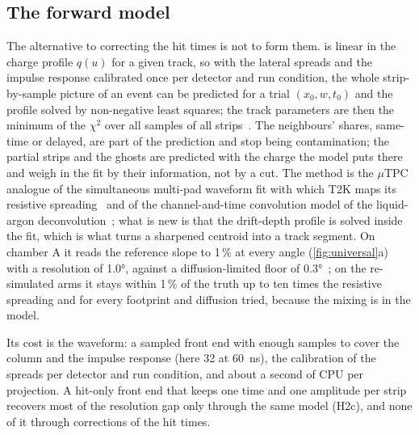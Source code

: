 \subsection{The forward model}\label{sec:forward}

The alternative to correcting the hit times is not to form them.  is linear in the charge profile $q(u)$ for
a given track, so with the lateral spreads and the impulse response calibrated once per detector and run condition, the whole
strip-by-sample picture of an event can be predicted for a trial $(x_0, w, t_0)$ and the profile solved by non-negative least
squares; the track parameters are then the minimum of the $\chi^2$ over all samples of all strips~\cite{paperII}. The neighbours'
shares, same-time or delayed, are part of the prediction and stop being contamination; the partial strips and the ghosts are
predicted with the charge the model puts there and weigh in the fit by their information, not by a cut. The method is the
$\mu$TPC analogue of the simultaneous multi-pad waveform fit with which T2K maps its resistive spreading~\cite{T2K2023} and of
the channel-and-time convolution model of the liquid-argon deconvolution~\cite{Adams2018a}; what is new is that the drift-depth
profile is solved inside the fit, which is what turns a sharpened centroid into a track segment. On chamber A it reads the
reference slope to 1\,\% at every angle (\cref{fig:universal}a) with a resolution of \ang{1.0}, against a diffusion-limited floor of
\ang{0.3}~\cite{paperII}; on the re-simulated arms it stays within 1\,\% of the truth up to ten times the resistive spreading and for
every footprint and diffusion tried, because the mixing is in the model.

Its cost is the waveform: a sampled front end with enough samples to cover the column and the impulse response (here 32 at
\SI{60}{ns}), the calibration of the spreads per detector and run condition, and about a second of CPU per projection. A
hit-only front end that keeps one time and one amplitude per strip recovers most of the resolution gap only through the same
model (H2c), and none of it through corrections of the hit times.

